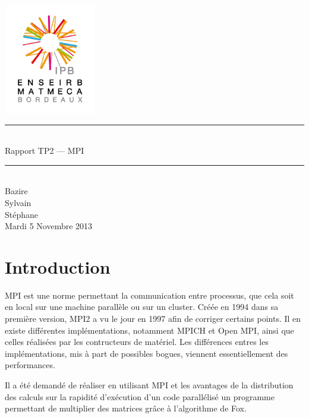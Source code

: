 \documentclass[a4paper,11pt]{article}
\begin{document}
\begin{titlepage}
  \begin{center}

    \begin{center}
      \includegraphics[width=4cm]{EM.jpg}
    \end{center}

    \vspace*{1cm}
        
    \rule{0.75\linewidth}{0.7mm}\\[0.4cm]
    {\Huge Rapport TP2 --- MPI\\[0.4cm]}
    \rule{0.75\linewidth}{0.7mm} \\[1.5cm]

    {\Large Bazire \\Sylvain {}\\Stéphane \\[2cm]}
    {\Large Mardi 5 Novembre 2013}
  \end{center}
\end{titlepage}

\tableofcontents
\clearpage
\section{Introduction}
MPI est une norme permettant la communication entre processus, que cela soit en local sur une machine parallèle ou sur un cluster. Créée en 1994 dans sa première version, MPI2 a vu le jour en 1997 afin de corriger certains points. Il en existe différentes implémentations, notamment MPICH et Open MPI, ainsi que celles réalisées par les contructeurs de matériel. Les différences entres les implémentations, mis à part de possibles bogues, viennent essentiellement des performances.

Il a été demandé de réaliser en utilisant MPI et les avantages de la distribution des calculs sur la rapidité d'exécution d'un code parallélisé un programme permettant de multiplier des matrices grâce à l'algorithme de Fox.
\end{document}
